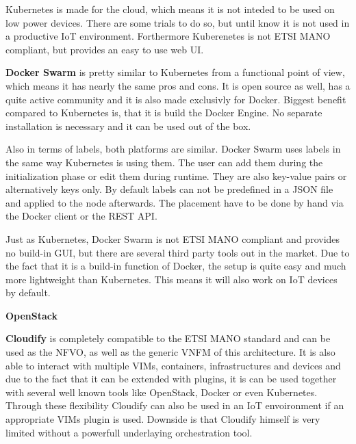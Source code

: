 Kubernetes is made for the cloud, which means it is not inteded to be used on low power devices.
There are some trials to do so, but until know it is not used in a productive \ac{IoT} environment.
Forthermore Kuberenetes is not \ac{ETSI} \ac{MANO} compliant, but provides an easy to use web \ac{UI}.

\textbf{Docker Swarm} is pretty similar to Kubernetes from a functional point of view, which means it has nearly the same pros and cons.
It is open source as well, has a quite active community and it is also made exclusivly for Docker.
Biggest benefit compared to Kubernetes is, that it is build the Docker Engine.
No separate installation is necessary and it can be used out of the box.

Also in terms of labels, both platforms are similar.
Docker Swarm uses labels in the same way Kubernetes is using them.
The user can add them during the initialization phase or edit them during runtime.
They are also key-value pairs or alternatively keys only.
By default labels can not be predefined in a \ac{JSON} file and applied to the node afterwards.
The placement have to be done by hand via the Docker client or the \ac{REST} \ac{API}.

Just as Kubernetes, Docker Swarm is not \ac{ETSI} \ac{MANO} compliant and provides no build-in \ac{GUI}, but there are several third party tools out in the market.
Due to the fact that it is a build-in function of Docker, the setup is quite easy and much more lightweight than Kubernetes.
This means it will also work on \ac{IoT} devices by default.

\textbf{OpenStack}
\doit

\textbf{Cloudify} is completely compatible to the \ac{ETSI} \ac{MANO} standard and can be used as the \ac{NFVO}, as well as the generic \ac{VNFM} of this architecture.\cite[cf.]{Cloudify:MANO}
It is also able to interact with multiple \acp{VIM}, containers, infrastructures and devices and due to the fact that it can be extended with plugins, it is can be used together with several well known tools like OpenStack, Docker or even Kubernetes.\cite[cf.]{Cloudify:MANO}
Through these flexibility Cloudify can also be used in an \ac{IoT} envoironment if an appropriate \acp{VIM} plugin is used.
Downside is that Cloudify himself is very limited without a powerfull underlaying orchestration tool.


